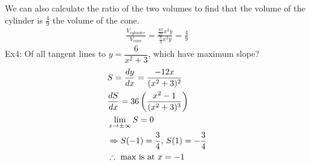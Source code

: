 \documentclass[11pt, fleqn]{article}
\begin{document}
We can also calculate the ratio of the two volumes to find that the volume of the cylinder is $\frac{4}{9}$ the volume of the cone.
\begin{align*}
    \frac{V_{cylinder}}{V_{cone}}=\frac{\frac{4\pi}{27}x^2y}{\frac{\pi}{3} x^2y}=\frac{4}{9}
\end{align*}
Ex4: Of all tangent lines to $y=\dfrac{6}{x^2+3}$, which have maximum slope?
\begin{align*}
    &S=\frac{dy}{dx}=\frac{-12x}{(x^2+3)^2}\\
    &\frac{dS}{dx}=36\left( \frac{x^2-1}{(x^2+3)^3} \right)\\
    &\lim_{x\to\pm\infty}S=0\\
    &\Rightarrow S(-1)=\frac{3}{4},\, S(1)=-\frac{3}{4}\\
    &\therefore\text{ max is at }x=-1
\end{align*}
\end{document}

